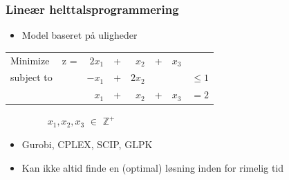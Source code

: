 \documentclass[smaller]{beamer}
\begin{document}
\begin{frame}
\frametitle{Lineær helttalsprogrammering}
\begin{itemize}[<+->]  
\item Model baseret på uligheder
\end{itemize}
\begin{table}[]
\begin{center}
\label{my-label}
\begin{tabular}{llrcrlrl}
Minimize   & z =&$2x_1$        & +  & $x_2$       & + & $x_3$ &          \\
subject to &     &$-x_1$        & + & $2x_2$      &   &       & $\leq 1$  \\
           &     &$x_1$         & + & $x_2$       & + & $x_3$ & $=2$     
               
\end{tabular}
\end{center}
$\qquad \qquad $ $x_1,x_2,x_3 $  $\in$ $\mathbb{Z}^+$ 
\end{table}

\begin{itemize}[<+->]
\item Gurobi, CPLEX, SCIP, GLPK
\item Kan ikke altid finde en (optimal) løsning inden for rimelig tid
\end{itemize}

    
\end{frame}


\end{document}
